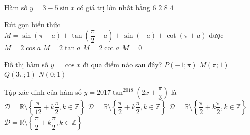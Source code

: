 \begin{ex}%
	Hàm số $y=3-5\sin x$ có giá trị lớn nhất bằng
	\choice
	{$6$}
	{$2$}
	{\True $8$}
	{$4$}
\end{ex}

\begin{ex}%
	Rút gọn biểu thức $M=\sin(\pi-a)+\tan\left(\dfrac{\pi}{2}-a\right)+\sin(-a)+\cot(\pi+a)$ được
	\choice
	{$M=2\cos a$}
	{$M=2\tan a$}
	{\True $M=2\cot a$}
	{$M=0$}
\end{ex}

\begin{ex}%
	Đồ thị hàm số $y=\cos x$ đi qua điểm nào sau đây?
	\choice
	{$P(-1;\pi)$}
	{$M(\pi;1)$}
	{$Q(3\pi; 1)$}
	{\True $N(0;1)$}
\end{ex}

\begin{ex}%
	Tập xác định của hàm số $y=2017\tan^{2018} \left( 2x+\dfrac{\pi}{3}\right)$ là
	\choice
	{\True $\mathscr{D}=\mathbb{R}\setminus\left\lbrace\dfrac{\pi}{12}+k\dfrac{\pi}{2}, k\in\mathbb{Z} \right\rbrace $}
	{$\mathscr{D}=\mathbb{R}\setminus\left\lbrace\dfrac{\pi}{2}+k\dfrac{\pi}{2}, k\in\mathbb{Z} \right\rbrace $}
	{$\mathscr{D}=\mathbb{R}\setminus\left\lbrace\dfrac{\pi}{2}+k\dfrac{\pi}{2}, k\in\mathbb{Z} \right\rbrace $}
	{$\mathscr{D}=\mathbb{R}\setminus\left\lbrace\dfrac{\pi}{2}+k\dfrac{\pi}{2}, k\in\mathbb{Z} \right\rbrace $}
\end{ex}


